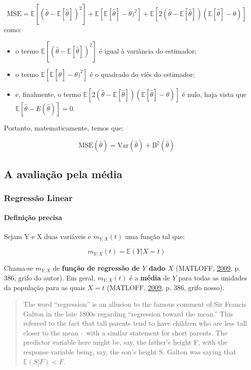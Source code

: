\documentclass[a4paper, 12pt]{article}
\providecommand{\tightlist}{%
  \setlength{\itemsep}{0pt}\setlength{\parskip}{0pt}}
\let\oldparagraph\paragraph
\renewcommand{\paragraph}[1]{\oldparagraph{#1}\mbox{}}
\begin{document}
\[\text{MSE} = \mathbb{E}[(\hat{\theta} - \mathbb{E}[\hat{\theta}])^2] + \mathbb{E}[\mathbb{E}[\hat{\theta}] - \theta)^2] + \mathbb{E}[2(\hat{\theta} - \mathbb{E}[\hat{\theta}])(\mathbb{E}[\hat{\theta}] - \theta)]\]
como:

\begin{itemize}
\tightlist
\item
  o termo \(\mathbb{E}[(\hat{\theta} - \mathbb{E}[\hat{\theta}])^2]\) é
  igual à variância do estimador;
\item
  o termo \(\mathbb{E}[\mathbb{E}[\hat{\theta}] - \theta)^2]\) é o
  quadrado do viés do estimador;
\item
  e, finalmente, o termo
  \(\mathbb{E}[2(\hat{\theta} - \mathbb{E}[\hat{\theta}])(\mathbb{E}[\hat{\theta}] - \theta)]\)
  é nulo, haja vista que
  \(\mathbb{E}[\hat{\theta} - E(\hat{\theta})] = 0\).
\end{itemize}

Portanto, matematicamente, temos que:

\[\text{MSE}(\hat{\theta}) = \text{Var}(\hat{\theta}) + \text{B}^2(\hat{\theta})\]

\subsection{A avaliação pela média}\label{a-avaliacao-pela-media}

\subsubsection{Regressão Linear}\label{regressao-linear}

\paragraph{Definição precisa}\label{definicao-precisa}

Sejam Y e X duas variáveis e \(m_{Y;X}(t)\) uma função tal que:

\[m_{Y;X}(t) = \mathbb{E}(Y|X = t)\]

Chama-se \(m_{Y;X}\) de \textbf{função de regressão de \(Y\) dado \(X\)}
(MATLOFF, \protect\hyperlink{ref-matloff2009}{2009}, p. 386, grifo do
autor). Em geral, \(m_{Y;X}(t)\) é a \textbf{média} de \(Y\) para todas
as unidades da população para as quais \(X = t\) (MATLOFF,
\protect\hyperlink{ref-matloff2009}{2009}, p. 386, grifo nosso).

\begin{quote}
The word ``regression'' is an allusion to the famous comment of Sir
Francis Galton in the late 1800s regarding ``regression toward the
mean.'' This referred to the fact that tall parents tend to have
children who are less tall closer to the mean -- with a similar
statement for short parents. The predictor variable here might be, say,
the father's height F, with the response variable being, say, the son's
height S. Galton was saying that \(\mathbb{E}(S|F) < F\).
\end{quote}
\end{document}
